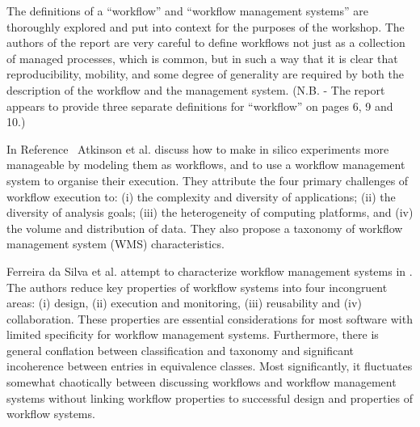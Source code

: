 The definitions of a ``workflow'' and ``workflow management systems'' are
thoroughly explored and put into context for the purposes of the workshop. The
authors of the report are very careful to define workflows not just as a
collection of managed processes, which is common, but in such a way that it is
clear that reproducibility, mobility, and some degree of generality are required
by both the description of the workflow and the management system. (N.B. - The
report appears to provide three separate definitions for ``workflow'' on pages
6, 9 and 10.)


In Reference~\cite{atkinson-csur} Atkinson et al. discuss how to make in
silico experiments more manageable by modeling them as workflows, and to use a
workflow management system to organise their execution. They attribute the
four primary challenges of workflow execution to: (i) the complexity and
diversity of applications; (ii) the diversity of analysis goals; (iii) the
heterogeneity of computing platforms, and (iv) the volume and distribution of
data. They also propose a taxonomy of workflow management system (WMS)
characteristics.

Ferreira da Silva et al. attempt to characterize workflow management systems in
\cite{ferreira_da_silva_characterization_nodate}. The authors reduce key
properties of workflow systems into four incongruent areas: (i) design, (ii)
execution and monitoring, (iii) reusability and (iv) collaboration. These
properties are essential considerations for most  software with limited
specificity for workflow management systems. Furthermore, there is general
conflation between classification and taxonomy and significant incoherence
between entries in equivalence classes. Most significantly, it fluctuates
somewhat chaotically between discussing workflows and workflow management
systems without linking workflow properties to successful design and properties
of workflow systems.
